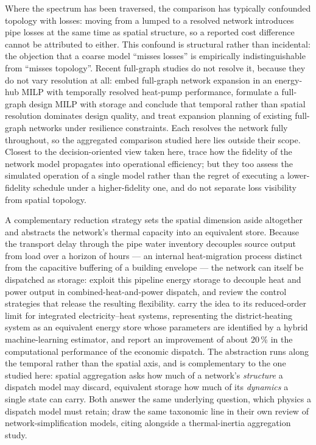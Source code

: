 \documentclass[a4paper,fleqn]{cas-sc}
\begin{document}
Where the spectrum has been traversed, the comparison has typically confounded topology
with losses: moving from a lumped to a resolved network introduces pipe losses at the same
time as spatial structure, so a reported cost difference cannot be attributed to either.
This confound is structural rather than incidental: the objection that a coarse model
``misses losses'' is empirically indistinguishable from ``misses topology''. Recent full-graph studies do not resolve it,
because they do not vary resolution at all: \citet{Trentmann2026} embed full-graph
network expansion in an energy-hub MILP with temporally resolved heat-pump performance,
\citet{Ceruti2025} formulate a full-graph design MILP with storage and conclude that
temporal rather than spatial resolution dominates design quality, and
\citet{Vieth2026} treat expansion planning of existing full-graph networks under
resilience constraints. Each resolves the network fully throughout, so the aggregated
comparison studied here lies outside their scope. Closest to the decision-oriented view
taken here, \citet{Friedrich2025} trace how the fidelity of the network model propagates
into operational efficiency; but they too assess the simulated operation of a single model
rather than the regret of executing a lower-fidelity schedule under a higher-fidelity one,
and do not separate loss visibility from spatial topology.

A complementary reduction strategy sets the spatial dimension aside altogether and abstracts
the network's thermal capacity into an equivalent store. Because the transport delay through
the pipe water inventory decouples source output from load over a horizon of hours --- an
internal heat-migration process distinct from the capacitive buffering of a building
envelope --- the network can itself be dispatched as
storage: \citet{Li2016_pipeline} exploit this pipeline energy storage to decouple heat and
power output in combined-heat-and-power dispatch, and \citet{Vandermeulen2018} review the
control strategies that release the resulting flexibility. \citet{Yang2024_equivalent} carry
the idea to its reduced-order limit for integrated electricity--heat systems, representing
the district-heating system as an equivalent energy store whose parameters are identified by
a hybrid machine-learning estimator, and report an improvement of about $20$\,\% in the
computational performance of the economic dispatch. The abstraction runs along the temporal
rather than the spatial axis, and is complementary to the one studied here: spatial
aggregation asks how much of a network's \emph{structure} a dispatch model may discard,
equivalent storage how much of its \emph{dynamics} a single state can carry. Both answer the
same underlying question, which physics a dispatch model must retain; \citet{Yang2024_equivalent}
draw the same taxonomic line in their own review of network-simplification models, citing
\citet{Falay2020} alongside a thermal-inertia aggregation study.
\end{document}
